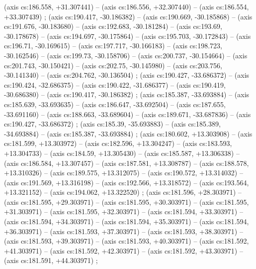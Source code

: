     (axis cs:186.558,    +31.307441) --  (axis cs:186.556,    +32.307440) --  (axis cs:186.554,    +33.307439) ;
    (axis cs:190.417,    -30.186382) --  (axis cs:190.669,    -30.185868) --  (axis cs:191.676,    -30.183680) --  (axis cs:192.683,    -30.181284) --  (axis cs:193.69,    -30.178678) --  (axis cs:194.697,    -30.175864) --  (axis cs:195.703,    -30.172843) --  (axis cs:196.71,    -30.169615) --  (axis cs:197.717,    -30.166183) --  (axis cs:198.723,    -30.162546) --  (axis cs:199.73,    -30.158706) --  (axis cs:200.737,    -30.154664) --  (axis cs:201.743,    -30.150421) --  (axis cs:202.75,    -30.145980) --  (axis cs:203.756,    -30.141340) --  (axis cs:204.762,    -30.136504) ;
    (axis cs:190.427,    -33.686372) --  (axis cs:190.424,    -32.686375) --  (axis cs:190.422,    -31.686377) --  (axis cs:190.419,    -30.686380) --  (axis cs:190.417,    -30.186382) ;
    (axis cs:185.387,    -33.693884) --  (axis cs:185.639,    -33.693635) --  (axis cs:186.647,    -33.692504) --  (axis cs:187.655,    -33.691160) --  (axis cs:188.663,    -33.689604) --  (axis cs:189.671,    -33.687836) --  (axis cs:190.427,    -33.686372) ;
    (axis cs:185.39,    -35.693883) --  (axis cs:185.389,    -34.693884) --  (axis cs:185.387,    -33.693884) ;
    (axis cs:180.602,    +13.303908) --  (axis cs:181.599,    +13.303972) --  (axis cs:182.596,    +13.304247) --  (axis cs:183.593,    +13.304733) --  (axis cs:184.59,    +13.305430) --  (axis cs:185.587,    +13.306338) --  (axis cs:186.584,    +13.307457) --  (axis cs:187.581,    +13.308787) --  (axis cs:188.578,    +13.310326) --  (axis cs:189.575,    +13.312075) --  (axis cs:190.572,    +13.314032) --  (axis cs:191.569,    +13.316198) --  (axis cs:192.566,    +13.318572) --  (axis cs:193.564,    +13.321152) --  (axis cs:194.062,    +13.322520) ;
    (axis cs:181.596,    +28.303971) --  (axis cs:181.595,    +29.303971) --  (axis cs:181.595,    +30.303971) --  (axis cs:181.595,    +31.303971) --  (axis cs:181.595,    +32.303971) --  (axis cs:181.594,    +33.303971) --  (axis cs:181.594,    +34.303971) --  (axis cs:181.594,    +35.303971) --  (axis cs:181.594,    +36.303971) --  (axis cs:181.593,    +37.303971) --  (axis cs:181.593,    +38.303971) --  (axis cs:181.593,    +39.303971) --  (axis cs:181.593,    +40.303971) --  (axis cs:181.592,    +41.303971) --  (axis cs:181.592,    +42.303971) --  (axis cs:181.592,    +43.303971) --  (axis cs:181.591,    +44.303971) ;
